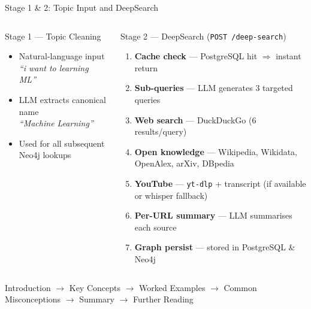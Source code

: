 \documentclass[aspectratio=169,9pt]{beamer}
\begin{document}
\begin{frame}{Stage 1 \& 2: Topic Input and DeepSearch}
\begin{columns}[T]
  \begin{block}{Stage 1 — Topic Cleaning}
    \begin{itemize}
      \item Natural-language input \\
        \small\textit{``i want to learning ML''}
      \item LLM extracts canonical name \\
        \small\textit{``Machine Learning''}
      \item Used for all subsequent Neo4j lookups
    \end{itemize}
  \end{block}

  \begin{block}{Stage 2 — DeepSearch (\texttt{POST /deep-search})}
    \begin{enumerate}
      \item \textbf{Cache check} — PostgreSQL hit $\Rightarrow$ instant return
      \item \textbf{Sub-queries} — LLM generates 3 targeted queries
      \item \textbf{Web search} — DuckDuckGo (6 results/query)
      \item \textbf{Open knowledge} — Wikipedia, Wikidata, OpenAlex, arXiv, DBpedia
      \item \textbf{YouTube} — \texttt{yt-dlp} + transcript (if available or whisper fallback)
      \item \textbf{Per-URL summary} — LLM summarises each source
      \item \textbf{Graph persist} — stored in PostgreSQL \& Neo4j
    \end{enumerate}
  \end{block}
\end{columns}

\vspace{0.3cm}
\begin{keybox}[title={Lesson Structure Generated by LLM}]
  \small
  Introduction $\to$ Key Concepts $\to$ Worked Examples $\to$ Common Misconceptions $\to$ Summary $\to$ Further Reading
\end{keybox}
\end{frame}
\end{document}
